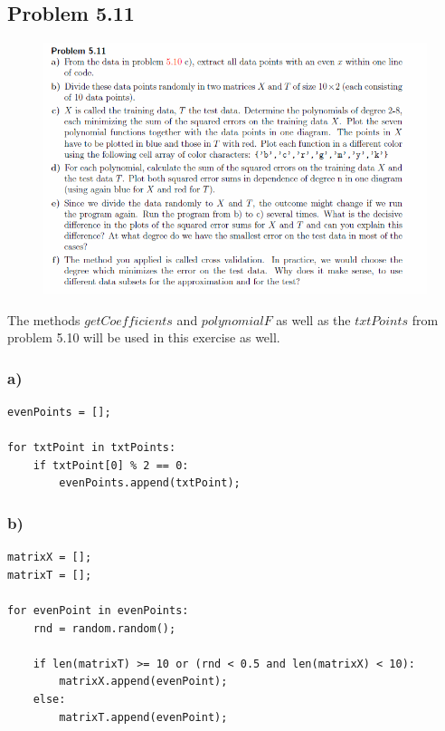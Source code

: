 \subsection{Problem 5.11}


\begin{figure}[!ht]
\includegraphics[width=1\textwidth]{chapters/images/desc-5-11}
\end{figure}

The methods $getCoefficients$ and $polynomialF$ as well as the $txtPoints$ from problem 5.10 will be used in this exercise as well.


\subsubsection{a)}

\begin{lstlisting}[caption=todo]
evenPoints = [];

for txtPoint in txtPoints:
	if txtPoint[0] % 2 == 0:
		evenPoints.append(txtPoint);
\end{lstlisting}


\subsubsection{b)}

\begin{lstlisting}[caption=todo]
matrixX = [];
matrixT = [];

for evenPoint in evenPoints:
	rnd = random.random();
	
	if len(matrixT) >= 10 or (rnd < 0.5 and len(matrixX) < 10):
		matrixX.append(evenPoint);
	else:
		matrixT.append(evenPoint);
\end{lstlisting}


